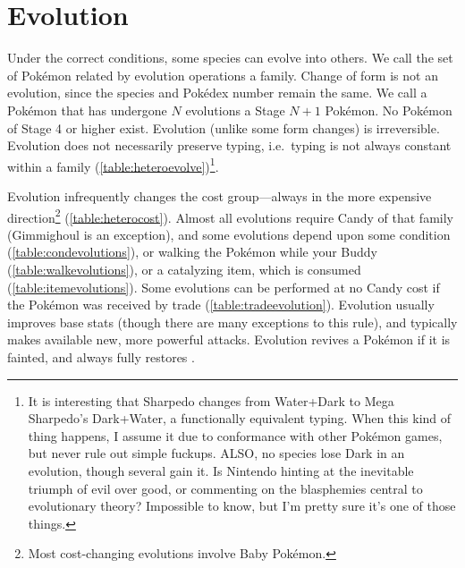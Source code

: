 \section{Evolution\label{sec:evolution}}
Under the correct conditions, some species can evolve into others.
We call the set of Pokémon related by evolution operations a family.
Change of form is not an evolution, since the species and Pokédex number remain the same.
We call a Pokémon that has undergone $N$ evolutions a Stage $N+1$ Pokémon.
No Pokémon of Stage 4 or higher exist.
Evolution (unlike some form changes) is irreversible.
Evolution does not necessarily preserve typing, i.e.\ typing is not always constant within a family (\autoref{table:heteroevolve})\footnote{It is interesting
  that Sharpedo changes from Water+Dark to Mega Sharpedo's Dark+Water,
  a functionally equivalent typing. When this kind of thing happens,
  I assume it due to conformance with other Pokémon games, but never
  rule out simple fuckups. ALSO, no species lose Dark in an evolution,
  though several gain it. Is Nintendo hinting at the inevitable triumph of
  evil over good, or commenting on the blasphemies central to evolutionary theory?
  Impossible to know, but I'm pretty sure it's one of those things.}.

Evolution infrequently changes the cost group---always in the more expensive direction\footnote{Most
  cost-changing evolutions involve Baby Pokémon.} (\autoref{table:heterocost}).
Almost all evolutions require Candy of that family (Gimmighoul is an exception),
  and some evolutions depend upon some condition (\autoref{table:condevolutions}),
  or walking the Pokémon while your Buddy (\autoref{table:walkevolutions}),
  or a catalyzing item, which is consumed (\autoref{table:itemevolutions}).
Some evolutions can be performed at no Candy cost if the Pokémon was received by trade
 (\autoref{table:tradeevolution}).
Evolution usually improves base stats (though there are many exceptions to this rule),
  and typically makes available new, more powerful attacks.
Evolution revives a Pokémon if it is fainted, and always fully restores \HP\@.

